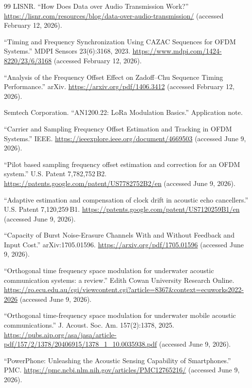 \documentclass[11pt]{article}
\begin{document}
\begin{thebibliography}{99}
LISNR. ``How Does Data over Audio Transmission Work?''
\url{https://lisnr.com/resources/blog/data-over-audio-transmission/}
(accessed February 12, 2026).

``Timing and Frequency Synchronization Using CAZAC Sequences for OFDM
Systems.'' MDPI Sensors 23(6):3168, 2023.
\url{https://www.mdpi.com/1424-8220/23/6/3168} (accessed February 12, 2026).

``Analysis of the Frequency Offset Effect on Zadoff--Chu Sequence Timing
Performance.'' arXiv. \url{https://arxiv.org/pdf/1406.3412}
(accessed February 12, 2026).

Semtech Corporation. ``AN1200.22: LoRa Modulation Basics.'' Application note.

``Carrier and Sampling Frequency Offset Estimation and Tracking in OFDM
Systems.'' IEEE.
\url{https://ieeexplore.ieee.org/document/4669503}
(accessed June 9, 2026).

``Pilot based sampling frequency offset estimation and correction for an OFDM
system.'' U.S. Patent 7{,}782{,}752\,B2.
\url{https://patents.google.com/patent/US7782752B2/en}
(accessed June 9, 2026).

``Adaptive estimation and compensation of clock drift in acoustic echo
cancellers.'' U.S. Patent 7{,}120{,}259\,B1.
\url{https://patents.google.com/patent/US7120259B1/en}
(accessed June 9, 2026).

``Capacity of Burst Noise-Erasure Channels With and Without Feedback and
Input Cost.'' arXiv:1705.01596.
\url{https://arxiv.org/pdf/1705.01596} (accessed June 9, 2026).

``Orthogonal time frequency space modulation for underwater acoustic
communication systems: a review.'' Edith Cowan University Research Online.
\url{https://ro.ecu.edu.au/cgi/viewcontent.cgi?article=8367&context=ecuworks2022-2026}
(accessed June 9, 2026).

``Orthogonal time-frequency space modulation for underwater mobile acoustic
communications.'' J. Acoust. Soc. Am. 157(2):1378, 2025.
\url{https://pubs.aip.org/asa/jasa/article-pdf/157/2/1378/20406915/1378_1_10.0035938.pdf}
(accessed June 9, 2026).

``PowerPhone: Unleashing the Acoustic Sensing Capability of Smartphones.''
PMC.
\url{https://pmc.ncbi.nlm.nih.gov/articles/PMC12765216/}
(accessed June 9, 2026).


\end{thebibliography}
\end{document}

